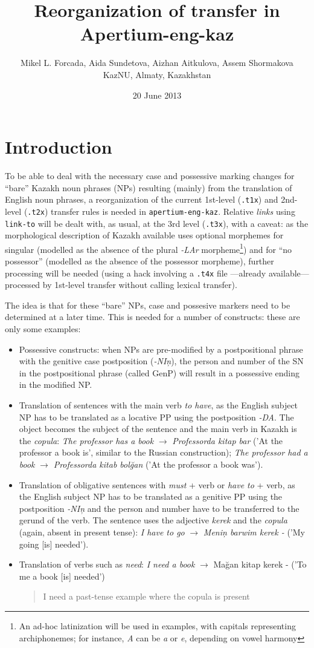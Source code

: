 \documentclass{article}
\title{Reorganization of transfer in Apertium-eng-kaz}
\author{Mikel L. Forcada, Aida Sundetova, Aizhan Aitkulova, Assem Shormakova \\ KazNU, Almaty, Kazakhstan}
\date{20 June 2013}
\newcommand{\com}[1]{\begin{quote}\begin{sf}#1\end{sf}\end{quote}}
\begin{document}
\maketitle

\section{Introduction}
To be able to deal with the necessary case and possessive marking changes for ``bare'' Kazakh noun phrases (NPs) resulting (mainly) from the translation of English noun phrases, a reorganization of the current 1st-level (\texttt{.t1x}) and 2nd-level (\texttt{.t2x}) transfer rules is needed in \texttt{apertium-eng-kaz}. Relative \emph{links} using \texttt{link-to} will be dealt with, as usual, at the 3rd level (\texttt{.t3x}), with a caveat: as the morphological description of Kazakh available uses optional morphemes for singular (modelled as the absence of the plural \emph{-LAr} morpheme\footnote{An ad-hoc latinization will be used in examples, with capitals representing archiphonemes; for instance, \emph{A} can be \emph{a} or \emph{e}, depending on vowel harmony}) and for ``no possessor'' (modelled as the absence of the possessor morpheme), further processing will be needed (using a hack involving a \texttt{.t4x} file ---already available--- processed by 1st-level transfer without calling lexical transfer). 

The idea is that for these ``bare'' NPs, case and possesive markers need to be determined at a later time. This is needed for a number of constructs: these are only some examples:
\begin{itemize}
\item Possessive constructs: when NPs are pre-modified by a postpositional phrase with the genitive case postposition (\emph{-NI\c{n}}), the person and number of the SN in the postpositional phrase (called \(\mathrm{GenP}\)) will result in a possessive ending in the modified NP.
\item Translation of sentences with the main verb \emph{to have}, as the English subject NP has to be translated as a locative PP using the postposition \emph{-DA}. The object becomes the subject of the sentence and the main verb in Kazakh is the \emph{copula}:
\emph{The professor has a book} \(\to\) \emph{Professorda kitap bar} ('At the professor a book is',  similar to the Russian construction); \emph{The professor had a book} \(\to\) \emph{Professorda kitab bol\u{g}an} ('At the professor a book was').
\item Translation of obligative sentences with \emph{must} + verb or \emph{have to} + verb, as the English subject NP has to be translated as a genitive PP using the postposition \emph{-NI\c{n}} and the person and  number have to be transferred to the gerund of the verb. The sentence uses the adjective \emph{kerek} and the \emph{copula} (again, absent in present tense):
\emph{I have to go} \(\to\) \emph{Meni\c{n} barwim kerek -} ('My going [is] needed').
\item Translation of verbs such as \emph{need}: \emph{I need a book} \(\to\) {Ma\u{g}an kitap kerek -} ('To me a book [is] needed')
\com{I need a past-tense example where the copula is present}
\end{itemize}
\com{[The last list may be completed]}
\end{document}
